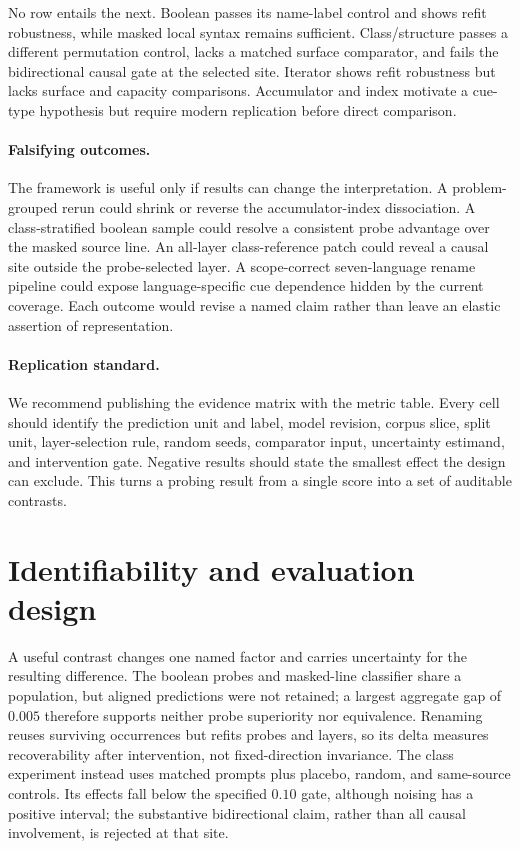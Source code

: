 \documentclass{article}
\begin{document}
No row entails the next. Boolean passes its name-label control and shows refit
robustness, while masked local syntax remains sufficient. Class/structure
passes a different permutation control, lacks a matched surface comparator,
and fails the bidirectional causal gate at the selected site. Iterator shows refit
robustness but lacks surface and capacity comparisons. Accumulator and index
motivate a cue-type hypothesis but require modern replication before direct
comparison.

\paragraph{Falsifying outcomes.}
The framework is useful only if results can change the interpretation. A
problem-grouped rerun could shrink or reverse the accumulator-index
dissociation. A class-stratified boolean sample could resolve a consistent
probe advantage over the masked source line. An all-layer class-reference
patch could reveal a causal site outside the probe-selected layer. A
scope-correct seven-language rename pipeline could expose language-specific
cue dependence hidden by the current coverage. Each outcome would revise a
named claim rather than leave an elastic assertion of representation.

\paragraph{Replication standard.}
We recommend publishing the evidence matrix with the metric table. Every cell
should identify the prediction unit and label, model revision, corpus slice,
split unit, layer-selection rule, random seeds, comparator input, uncertainty
estimand, and intervention gate. Negative results should state the smallest
effect the design can exclude. This turns a probing result from a single score
into a set of auditable contrasts.

\section{Identifiability and evaluation design}

A useful contrast changes one named factor and carries uncertainty for the
resulting difference. The boolean probes and masked-line classifier share a
population, but aligned predictions were not retained; a largest aggregate gap
of $0.005$ therefore supports neither probe superiority nor equivalence.
Renaming reuses surviving occurrences but refits probes and layers, so its
delta measures recoverability after intervention, not fixed-direction
invariance. The class experiment instead uses matched prompts plus placebo,
random, and same-source controls. Its effects fall below the specified $0.10$
gate, although noising has a positive interval; the substantive bidirectional
claim, rather than all causal involvement, is rejected at that site.
\end{document}
